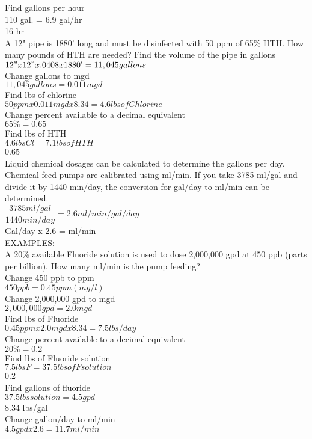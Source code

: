\documentclass{article}
\begin{document}
Find gallons per hour\\
110 gal. = 6.9 gal/hr\\
16 hr\\
A 12" pipe is 1880' long and must be disinfected with 50 ppm of 65\% HTH. How many pounds of HTH are needed? Find the volume of the pipe in gallons\\
$12" x 12" x .0408 x 1880' = 11, 045 gallons$\\
Change gallons to mgd\\
$11,045 gallons = 0.011 mgd$\\
Find lbs of chlorine\\
$50 ppm x 0.011 mgd x 8.34 = 4.6 lbs of Chlorine$\\
Change percent available to a decimal equivalent\\
$65\%= 0.65$\\
Find lbs of HTH\\
$4.6 lbs Cl = 7.1 lbs of HTH$\\
0.65\\
Liquid chemical dosages can be calculated to determine the gallons per day. Chemical feed pumps are calibrated using ml/min. If you take 3785 ml/gal and divide it by 1440 min/day, the conversion for gal/day to ml/min can be determined.\\
$\dfrac{3785 ml/gal}{1440 min/day} = 2.6 ml/min /gal/day$\\
Gal/day x 2.6 = ml/min\\
EXAMPLES:\\
A 20\% available Fluoride solution is used to dose 2,000,000 gpd at 450 ppb (parts per billion). How many ml/min is the pump feeding?\\
Change 450 ppb to ppm\\
$450 ppb = 0.45 ppm (mg/l)$\\
Change 2,000,000 gpd to mgd\\
$2,000,000 gpd = 2.0 mgd$\\
Find lbs of Fluoride\\
$0.45 ppm x 2.0 mgd x 8.34 = 7.5 lbs/day$\\
Change percent available to a decimal equivalent\\
$20\%= 0.2$\\
Find lbs of Fluoride solution\\
$7.5lbs F = 37.5 lbs of F solution$\\
0.2\\
Find gallons of fluoride\\
$37.5 lbs solution = 4.5 gpd$\\
8.34 lbs/gal\\
Change gallon/day to ml/min\\
$4.5 gpd x 2.6 = 11.7 ml/min$\\
\end{document}
